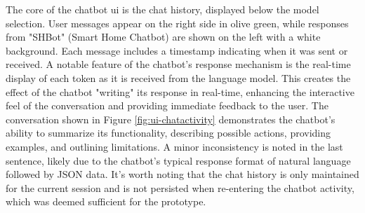The core of the chatbot \gls{ui} is the chat history, displayed below the model selection. User messages appear on the right side in olive green, while responses from "SHBot" (Smart Home Chatbot) are shown on the left with a white background. Each message includes a timestamp indicating when it was sent or received.
A notable feature of the chatbot's response mechanism is the real-time display of each token as it is received from the language model. This creates the effect of the chatbot "writing" its response in real-time, enhancing the interactive feel of the conversation and providing immediate feedback to the user.
The conversation shown in Figure \ref{fig:ui-chatactivity} demonstrates the chatbot's ability to summarize its functionality, describing possible actions, providing examples, and outlining limitations. A minor inconsistency is noted in the last sentence, likely due to the chatbot's typical response format of natural language followed by JSON data.
It's worth noting that the chat history is only maintained for the current session and is not persisted when re-entering the chatbot activity, which was deemed sufficient for the prototype.

